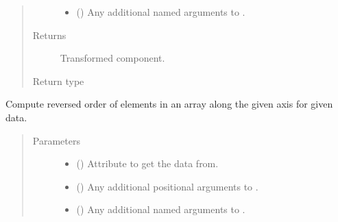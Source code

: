 \documentclass[letterpaper,10pt,english]{sphinxmanual}
\begin{document}
\begin{fulllineitems}
\begin{fulllineitems}
\begin{quote}
\begin{description}
\begin{itemize}
\item {} 
 () \textendash{} Any additional named arguments to .

\end{itemize}

\item[{Returns}] \leavevmode
{} \textendash{} Transformed component.

\item[{Return type}] \leavevmode
{\hyperref[\detokenize{api/base_classes:geology.src.base_spatial.SpatialComponent}]{}}

\end{description}\end{quote}

\end{fulllineitems}


\begin{fulllineitems}
\label{\detokenize{api/rock:geology.src.Rock.flip}}
Compute reversed order of elements in an array along the given axis for given data.
\begin{quote}\begin{description}
\item[{Parameters}] \leavevmode\begin{itemize}
\item {} 
 (\sphinxstyleliteralemphasis{\sphinxupquote{, }}) \textendash{} Attribute to get the data from.

\item {} 
 () \textendash{} Any additional positional arguments to .

\item {} 
 () \textendash{} Any additional named arguments to .


\end{itemize}
\end{description}
\end{quote}
\end{fulllineitems}
\end{fulllineitems}
\end{document}
